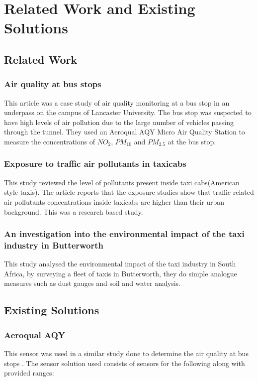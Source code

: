 \section{Related Work and Existing Solutions}
\subsection{Related Work}

\subsubsection{Air quality at bus stops \cite{busstop}}
This article was a case study of air quality monitoring at a bus stop in an underpass on the campus of Lancaster University. The bus stop was suspected to have high levels of air pollution due to the large number of vehicles passing through the tunnel. They used an Aeroqual AQY Micro Air Quality Station to measure the concentrations of $NO_2$, $PM_{10}$ and $PM_{2.5}$ at the bus stop. 




\subsubsection{Exposure to traffic air pollutants in taxicabs \cite{insidetaxismall}}
This study reviewed the level of pollutants present inside taxi cabs(American style taxis). The article reports that the exposure studies show that traffic related air pollutants concentrations inside taxicabs are higher than their urban background. This was a research based study.

\subsubsection{An investigation into the environmental impact of the taxi industry in Butterworth \cite{Environmentalimpact}}
This study analysed the environmental impact of the taxi industry in South Africa, by surveying a fleet of taxis in Butterworth, they do simple analogue measures such as dust gauges and soil and water analysis. 


\pagebreak
\subsection{Existing Solutions}

\subsubsection{Aeroqual AQY}
This sensor was used in a similar study done to determine the air quality at bus stops \cite{busstop}. 
The sensor solution used consists of sensors for the following along with provided ranges\cite{sensoraq}:

